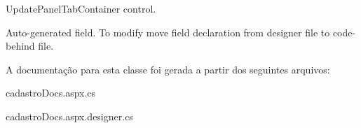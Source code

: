 UpdatePanelTabContainer control. 

Auto-\/generated field. To modify move field declaration from designer file to code-\/behind file. 

A documentação para esta classe foi gerada a partir dos seguintes arquivos:\begin{DoxyCompactItemize}
\item 
cadastroDocs.aspx.cs\item 
cadastroDocs.aspx.designer.cs\end{DoxyCompactItemize}
